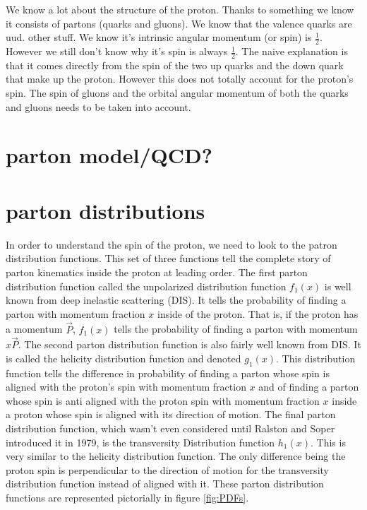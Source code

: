 \documentclass[abstract = on,listof=totoc, bibliography=totoc]{scrreprt}
\begin{document}
We know a lot about the structure of the proton. Thanks to something we know it consists of partons (quarks and gluons). We know that the valence quarks are uud. other stuff. We know it's intrinsic angular momentum (or spin) is $\frac{1}{2}$. However we still don't know why it's spin is always $\frac{1}{2}$.  The naive explanation is that it comes directly from the spin of the two up quarks and the down quark that make up the proton. However this does not totally account for the proton's spin. The spin of gluons and the orbital angular momentum of both the quarks and gluons needs to be taken into account.   


\section{parton model/QCD?}
\section{parton distributions}

In order to understand the spin of the proton, we need to look to the patron distribution functions. This set of three functions tell the complete story of parton kinematics inside the proton at leading order. The first parton distribution function called the unpolarized distribution function $f_1(x)$ is well known from deep inelastic scattering (DIS). It tells the probability of finding a parton with momentum fraction $x$ inside of the proton. That is, if the proton has a momentum $\vec{P}$, $f_1(x)$ tells the probability of finding a parton with momentum $x\vec{P}$.  The second parton distribution function is also fairly well known from DIS. It is called the helicity distribution function and denoted $g_1(x)$. This distribution function tells the difference in probability of finding a parton whose spin is aligned with the proton's spin with momentum fraction $x$ and of finding a parton whose spin is anti aligned with the proton spin with momentum fraction $x$ inside a proton whose spin is aligned with its direction of motion. The final parton distribution function, which wasn't even considered until Ralston and Soper introduced it in 1979\cite{transIntroduced}, is the transversity Distribution function $h_1(x)$. This is very similar to the helicity distribution function. The only difference being the proton spin is perpendicular to the direction of motion for the transversity distribution function instead of aligned with it. These parton distribution functions are represented pictorially in figure \ref{fig:PDFs}. \\
\end{document}
